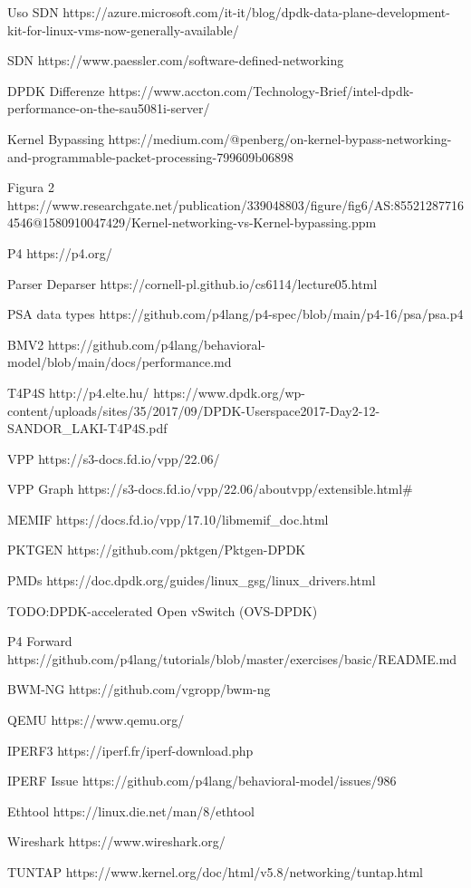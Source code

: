 Uso SDN https://azure.microsoft.com/it-it/blog/dpdk-data-plane-development-kit-for-linux-vms-now-generally-available/

SDN https://www.paessler.com/software-defined-networking

DPDK Differenze https://www.accton.com/Technology-Brief/intel-dpdk-performance-on-the-sau5081i-server/

Kernel Bypassing https://medium.com/@penberg/on-kernel-bypass-networking-and-programmable-packet-processing-799609b06898

Figura 2 https://www.researchgate.net/publication/339048803/figure/fig6/AS:855212877164546@1580910047429/Kernel-networking-vs-Kernel-bypassing.ppm

P4 https://p4.org/

Parser Deparser https://cornell-pl.github.io/cs6114/lecture05.html

PSA data types https://github.com/p4lang/p4-spec/blob/main/p4-16/psa/psa.p4

BMV2 https://github.com/p4lang/behavioral-model/blob/main/docs/performance.md

T4P4S http://p4.elte.hu/ https://www.dpdk.org/wp-content/uploads/sites/35/2017/09/DPDK-Userspace2017-Day2-12-SANDOR\_LAKI-T4P4S.pdf

VPP https://s3-docs.fd.io/vpp/22.06/

VPP Graph https://s3-docs.fd.io/vpp/22.06/aboutvpp/extensible.html#

MEMIF https://docs.fd.io/vpp/17.10/libmemif\_doc.html

PKTGEN https://github.com/pktgen/Pktgen-DPDK

PMDs https://doc.dpdk.org/guides/linux\_gsg/linux\_drivers.html

TODO:DPDK-accelerated Open vSwitch (OVS-DPDK)

P4 Forward https://github.com/p4lang/tutorials/blob/master/exercises/basic/README.md

BWM-NG https://github.com/vgropp/bwm-ng

QEMU https://www.qemu.org/

IPERF3 https://iperf.fr/iperf-download.php

IPERF Issue https://github.com/p4lang/behavioral-model/issues/986

Ethtool https://linux.die.net/man/8/ethtool

Wireshark https://www.wireshark.org/

TUNTAP https://www.kernel.org/doc/html/v5.8/networking/tuntap.html

